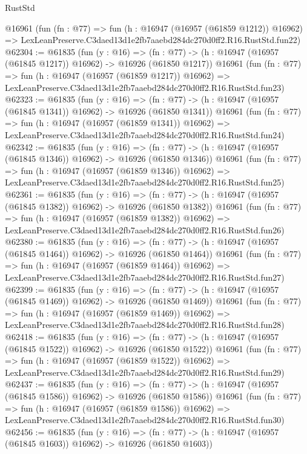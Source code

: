 \begin{lexlean}{RustStd}
\begin{coremodule}
    @16961
    (fun (fn : @77) =>
    fun (h : @16947 (@16957 (@61859 @1212)) @16962) =>
    LexLeanPreserve.C3daed13d1e2fb7aaebd284dc270d0ff2.R16.RustStd.fun22)
@62304 := @61835
    (fun (y : @16) =>
    (fn : @77) -> (h : @16947 (@16957 (@61845 @1217)) @16962) -> @16926 (@61850 @1217))
    @16961
    (fun (fn : @77) =>
    fun (h : @16947 (@16957 (@61859 @1217)) @16962) =>
    LexLeanPreserve.C3daed13d1e2fb7aaebd284dc270d0ff2.R16.RustStd.fun23)
@62323 := @61835
    (fun (y : @16) =>
    (fn : @77) -> (h : @16947 (@16957 (@61845 @1341)) @16962) -> @16926 (@61850 @1341))
    @16961
    (fun (fn : @77) =>
    fun (h : @16947 (@16957 (@61859 @1341)) @16962) =>
    LexLeanPreserve.C3daed13d1e2fb7aaebd284dc270d0ff2.R16.RustStd.fun24)
@62342 := @61835
    (fun (y : @16) =>
    (fn : @77) -> (h : @16947 (@16957 (@61845 @1346)) @16962) -> @16926 (@61850 @1346))
    @16961
    (fun (fn : @77) =>
    fun (h : @16947 (@16957 (@61859 @1346)) @16962) =>
    LexLeanPreserve.C3daed13d1e2fb7aaebd284dc270d0ff2.R16.RustStd.fun25)
@62361 := @61835
    (fun (y : @16) =>
    (fn : @77) -> (h : @16947 (@16957 (@61845 @1382)) @16962) -> @16926 (@61850 @1382))
    @16961
    (fun (fn : @77) =>
    fun (h : @16947 (@16957 (@61859 @1382)) @16962) =>
    LexLeanPreserve.C3daed13d1e2fb7aaebd284dc270d0ff2.R16.RustStd.fun26)
@62380 := @61835
    (fun (y : @16) =>
    (fn : @77) -> (h : @16947 (@16957 (@61845 @1464)) @16962) -> @16926 (@61850 @1464))
    @16961
    (fun (fn : @77) =>
    fun (h : @16947 (@16957 (@61859 @1464)) @16962) =>
    LexLeanPreserve.C3daed13d1e2fb7aaebd284dc270d0ff2.R16.RustStd.fun27)
@62399 := @61835
    (fun (y : @16) =>
    (fn : @77) -> (h : @16947 (@16957 (@61845 @1469)) @16962) -> @16926 (@61850 @1469))
    @16961
    (fun (fn : @77) =>
    fun (h : @16947 (@16957 (@61859 @1469)) @16962) =>
    LexLeanPreserve.C3daed13d1e2fb7aaebd284dc270d0ff2.R16.RustStd.fun28)
@62418 := @61835
    (fun (y : @16) =>
    (fn : @77) -> (h : @16947 (@16957 (@61845 @1522)) @16962) -> @16926 (@61850 @1522))
    @16961
    (fun (fn : @77) =>
    fun (h : @16947 (@16957 (@61859 @1522)) @16962) =>
    LexLeanPreserve.C3daed13d1e2fb7aaebd284dc270d0ff2.R16.RustStd.fun29)
@62437 := @61835
    (fun (y : @16) =>
    (fn : @77) -> (h : @16947 (@16957 (@61845 @1586)) @16962) -> @16926 (@61850 @1586))
    @16961
    (fun (fn : @77) =>
    fun (h : @16947 (@16957 (@61859 @1586)) @16962) =>
    LexLeanPreserve.C3daed13d1e2fb7aaebd284dc270d0ff2.R16.RustStd.fun30)
@62456 := @61835
    (fun (y : @16) =>
    (fn : @77) -> (h : @16947 (@16957 (@61845 @1603)) @16962) -> @16926 (@61850 @1603))

\end{coremodule}
\end{lexlean}
